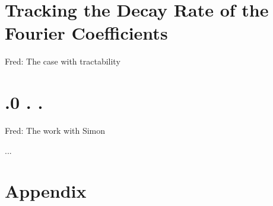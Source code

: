 \documentclass[USenglish]{article}
\newcommand{\FredNote}[1]{{\color{blue}Fred: #1}}
\begin{document}
\section{Tracking the Decay Rate of the Fourier Coefficients} 
\FredNote{The \cite{DinHic20a} case with tractability}


\section{
.0
.
.} 
\FredNote{The work with Simon}



\begin{acknowledgement}
  ...
\end{acknowledgement}





\section*{Appendix}
\end{document}
